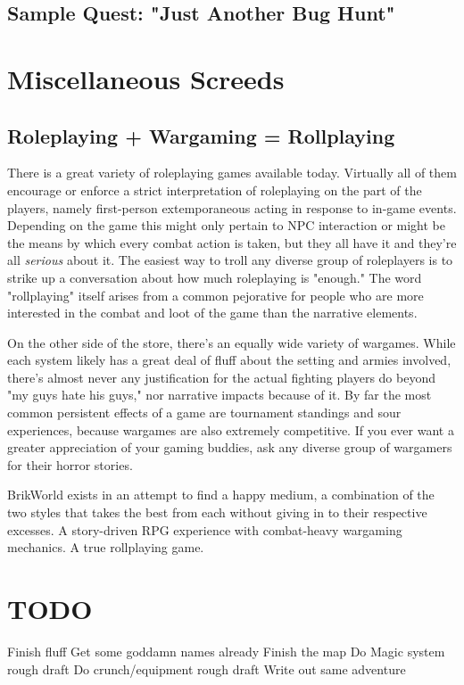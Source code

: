 \documentclass[12pt,a4paper,twocolumn]{article}
\begin{document}
\subsection{Sample Quest: "Just Another Bug Hunt"}

\section{Miscellaneous Screeds}
\subsection{Roleplaying + Wargaming = Rollplaying}
There is a great variety of roleplaying games available today.  Virtually all of them encourage or enforce a strict interpretation of roleplaying on the part of the players, namely first-person extemporaneous acting in response to in-game events.  Depending on the game this might only pertain to NPC interaction or might be the means by which every combat action is taken, but they all have it and they're all {\em serious} about it.  The easiest way to troll any diverse group of roleplayers is to strike up a conversation about how much roleplaying is "enough."  The word "rollplaying" itself arises from a common pejorative for people who are more interested in the combat and loot of the game than the narrative elements.

On the other side of the store, there's an equally wide variety of wargames.  While each system likely has a great deal of fluff about the setting and armies involved, there's almost never any justification for the actual fighting players do beyond "my guys hate his guys," nor narrative impacts because of it.  By far the most common persistent effects of a game are tournament standings and sour experiences, because wargames are also extremely competitive.  If you ever want a greater appreciation of your gaming buddies, ask any diverse group of wargamers for their horror stories.

BrikWorld exists in an attempt to find a happy medium, a combination of the two styles that takes the best from each without giving in to their respective excesses.  A story-driven RPG experience with combat-heavy wargaming mechanics.  A true rollplaying game.

\section {TODO}

Finish fluff
Get some goddamn names already
Finish the map
Do Magic system rough draft
Do crunch/equipment rough draft
Write out same adventure
\end{document}
